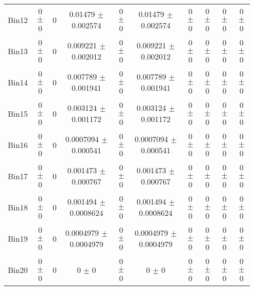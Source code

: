 \begin{tabular}{@{\extracolsep{4pt}}lccccccccc@{}}
     Bin12 & 0 $\pm$ 0 & 0 & 0.01479 $\pm$ 0.002574 & 0 $\pm$ 0 & 0.01479 $\pm$ 0.002574 & 0 $\pm$ 0 & 0 $\pm$ 0 & 0 $\pm$ 0 & 0 $\pm$ 0 \\ 
     Bin13 & 0 $\pm$ 0 & 0 & 0.009221 $\pm$ 0.002012 & 0 $\pm$ 0 & 0.009221 $\pm$ 0.002012 & 0 $\pm$ 0 & 0 $\pm$ 0 & 0 $\pm$ 0 & 0 $\pm$ 0 \\ 
     Bin14 & 0 $\pm$ 0 & 0 & 0.007789 $\pm$ 0.001941 & 0 $\pm$ 0 & 0.007789 $\pm$ 0.001941 & 0 $\pm$ 0 & 0 $\pm$ 0 & 0 $\pm$ 0 & 0 $\pm$ 0 \\ 
     Bin15 & 0 $\pm$ 0 & 0 & 0.003124 $\pm$ 0.001172 & 0 $\pm$ 0 & 0.003124 $\pm$ 0.001172 & 0 $\pm$ 0 & 0 $\pm$ 0 & 0 $\pm$ 0 & 0 $\pm$ 0 \\ 
     Bin16 & 0 $\pm$ 0 & 0 & 0.0007094 $\pm$ 0.000541 & 0 $\pm$ 0 & 0.0007094 $\pm$ 0.000541 & 0 $\pm$ 0 & 0 $\pm$ 0 & 0 $\pm$ 0 & 0 $\pm$ 0 \\ 
     Bin17 & 0 $\pm$ 0 & 0 & 0.001473 $\pm$ 0.000767 & 0 $\pm$ 0 & 0.001473 $\pm$ 0.000767 & 0 $\pm$ 0 & 0 $\pm$ 0 & 0 $\pm$ 0 & 0 $\pm$ 0 \\ 
     Bin18 & 0 $\pm$ 0 & 0 & 0.001494 $\pm$ 0.0008624 & 0 $\pm$ 0 & 0.001494 $\pm$ 0.0008624 & 0 $\pm$ 0 & 0 $\pm$ 0 & 0 $\pm$ 0 & 0 $\pm$ 0 \\ 
     Bin19 & 0 $\pm$ 0 & 0 & 0.0004979 $\pm$ 0.0004979 & 0 $\pm$ 0 & 0.0004979 $\pm$ 0.0004979 & 0 $\pm$ 0 & 0 $\pm$ 0 & 0 $\pm$ 0 & 0 $\pm$ 0 \\ 
     Bin20 & 0 $\pm$ 0 & 0 & 0 $\pm$ 0 & 0 $\pm$ 0 & 0 $\pm$ 0 & 0 $\pm$ 0 & 0 $\pm$ 0 & 0 $\pm$ 0 & 0 $\pm$ 0 \\ 
\hline\hline
  \end{tabular}
